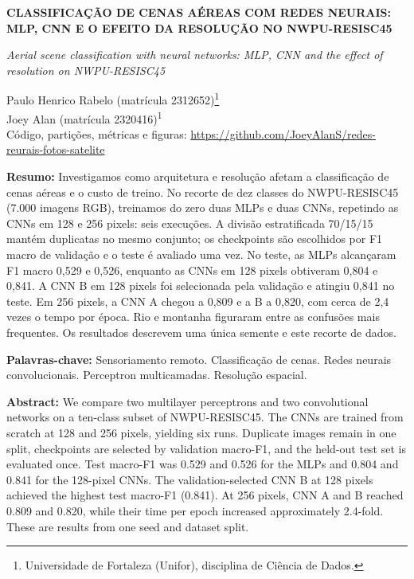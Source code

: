 \documentclass[12pt,a4paper]{article}
\begin{document}
\begin{center}
{\large\bfseries CLASSIFICAÇÃO DE CENAS AÉREAS COM REDES NEURAIS: MLP, CNN E O EFEITO DA RESOLUÇÃO NO NWPU-RESISC45\par}
\vspace{8pt}
{\itshape Aerial scene classification with neural networks: MLP, CNN and the effect of resolution on NWPU-RESISC45\par}
\vspace{10pt}
Paulo Henrico Rabelo (matrícula 2312652)\footnote{Universidade de Fortaleza (Unifor), disciplina de Ciência de Dados.}\\
Joey Alan (matrícula 2320416)\textsuperscript{1}\\[4pt]
{\small Código, partições, métricas e figuras: \url{https://github.com/JoeyAlanS/redes-reurais-fotos-satelite}}
\end{center}

\vspace{4pt}
\noindent\textbf{Resumo:} Investigamos como arquitetura e resolução afetam a classificação de cenas aéreas e o custo de treino. No recorte de dez classes do NWPU-RESISC45 (7.000 imagens RGB), treinamos do zero duas MLPs e duas CNNs, repetindo as CNNs em 128 e 256 pixels: seis execuções. A divisão estratificada 70/15/15 mantém duplicatas no mesmo conjunto; os checkpoints são escolhidos por F1 macro de validação e o teste é avaliado uma vez. No teste, as MLPs alcançaram F1 macro 0,529 e 0,526, enquanto as CNNs em 128 pixels obtiveram 0,804 e 0,841. A CNN B em 128 pixels foi selecionada pela validação e atingiu 0,841 no teste. Em 256 pixels, a CNN A chegou a 0,809 e a B a 0,820, com cerca de 2,4 vezes o tempo por época. Rio e montanha figuraram entre as confusões mais frequentes. Os resultados descrevem uma única semente e este recorte de dados.

\noindent\textbf{Palavras-chave:} Sensoriamento remoto. Classificação de cenas. Redes neurais convolucionais. Perceptron multicamadas. Resolução espacial.

\vspace{3pt}
\noindent\textbf{Abstract:} We compare two multilayer perceptrons and two convolutional networks on a ten-class subset of NWPU-RESISC45. The CNNs are trained from scratch at 128 and 256 pixels, yielding six runs. Duplicate images remain in one split, checkpoints are selected by validation macro-F1, and the held-out test set is evaluated once. Test macro-F1 was 0.529 and 0.526 for the MLPs and 0.804 and 0.841 for the 128-pixel CNNs. The validation-selected CNN B at 128 pixels achieved the highest test macro-F1 (0.841). At 256 pixels, CNN A and B reached 0.809 and 0.820, while their time per epoch increased approximately 2.4-fold. These are results from one seed and dataset split.
\end{document}
